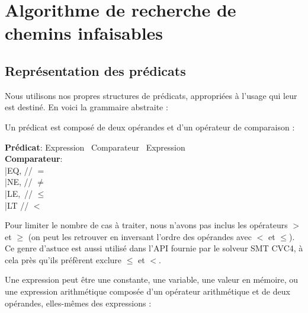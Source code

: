 \documentclass[french]{article}
\begin{document}
  
  
  \newpage{}
  \section{Algorithme de recherche de chemins infaisables}  
  \subsection{Représentation des prédicats}
  Nous utilisons nos propres structures de prédicats, appropriées à l'usage qui leur est destiné. En voici la grammaire abstraite :

  Un prédicat est composé de deux opérandes et d'un opérateur de comparaison :
  
  \begin{algorithm}[H]
    \textbf{Prédicat}: Expression \texttimes~Comparateur \texttimes~Expression\\
        \textbf{Comparateur}:\\
            \qquad |\quad EQ, // $=$\\
            \qquad |\quad NE, // $\neq$\\
            \qquad |\quad LE,\, // $\leq$\\
            \qquad |\quad LT\: // $<$\\
  \end{algorithm}
  
  Pour limiter le nombre de cas à traiter, nous n'avons pas inclus les opérateurs $>$ et $\geq$ (on peut les retrouver en inversant l'ordre des opérandes avec $<$ et $\leq$). Ce genre d'astuce est aussi utilisé dans l'API fournie par le solveur SMT CVC4, à cela près qu'ils préfèrent exclure $\leq$ et $<$.
  
  Une expression peut être une constante, une variable, une valeur en mémoire, ou une expression arithmétique composée d'un opérateur arithmétique et de deux opérandes, elles-mêmes des expressions :
\end{document}

